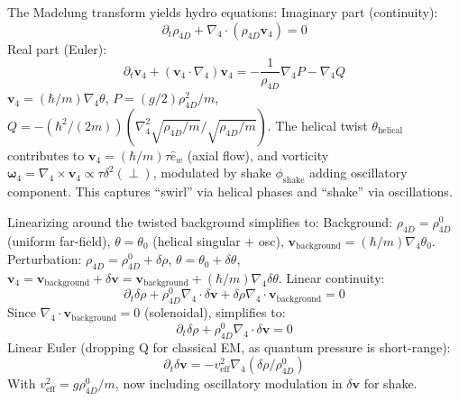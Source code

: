The Madelung transform yields hydro equations: Imaginary part (continuity):
\[ \partial_t \rho_{4D} + \nabla_4 \cdot (\rho_{4D} \mathbf{v}_4) = 0 \]
Real part (Euler):
\[ \partial_t \mathbf{v}_4 + (\mathbf{v}_4 \cdot \nabla_4) \mathbf{v}_4 = - \frac{1}{\rho_{4D}} \nabla_4 P - \nabla_4 Q \]
$\mathbf{v}_4 = (\hbar / m) \nabla_4 \theta$, $P = (g / 2) \rho_{4D}^2 / m$, $Q = - (\hbar^2 / (2m)) (\nabla_4^2 \sqrt{\rho_{4D} / m} / \sqrt{\rho_{4D} / m})$. The helical twist $\theta_{\text{helical}}$ contributes to $\mathbf{v}_4 = (\hbar / m) \tau \hat{e}_w$ (axial flow), and vorticity $\boldsymbol{\omega}_4 = \nabla_4 \times \mathbf{v}_4 \propto \tau \delta^2(\perp)$, modulated by shake $\phi_{\text{shake}}$ adding oscillatory component. This captures ``swirl'' via helical phases and ``shake'' via oscillations.

Linearizing around the twisted background simplifies to: Background: $\rho_{4D} = \rho_{4D}^0$ (uniform far-field), $\theta = \theta_0$ (helical singular + osc), $\mathbf{v}_{\text{background}} = (\hbar / m) \nabla_4 \theta_0$. Perturbation: $\rho_{4D} = \rho_{4D}^0 + \delta\rho$, $\theta = \theta_0 + \delta\theta$, $\mathbf{v}_4 = \mathbf{v}_{\text{background}} + \delta\mathbf{v} = \mathbf{v}_{\text{background}} + (\hbar / m) \nabla_4 \delta\theta$. Linear continuity:
\[ \partial_t \delta \rho + \rho_{4D}^0 \nabla_4 \cdot \delta \mathbf{v} + \delta \rho \nabla_4 \cdot \mathbf{v}_{\text{background}} = 0 \]
Since $\nabla_4 \cdot \mathbf{v}_{\text{background}} = 0$ (solenoidal), simplifies to:
\[ \partial_t \delta \rho + \rho_{4D}^0 \nabla_4 \cdot \delta \mathbf{v} = 0 \]
Linear Euler (dropping Q for classical EM, as quantum pressure is short-range):
\[ \partial_t \delta \mathbf{v} = - v_{\text{eff}}^2 \nabla_4 (\delta \rho / \rho_{4D}^0) \]
With $v_{\text{eff}}^2 = g \rho_{4D}^0 / m$, now including oscillatory modulation in $\delta \mathbf{v}$ for shake.

